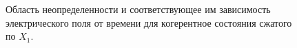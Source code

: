 \begin{figure}
\centering



\caption{Область неопределенности и соответствующее им зависимость
  электрического поля от времени для когерентное состояния сжатого по
  $X_1$.} 
\label{figPart3Squeezed_2}
\end{figure}
